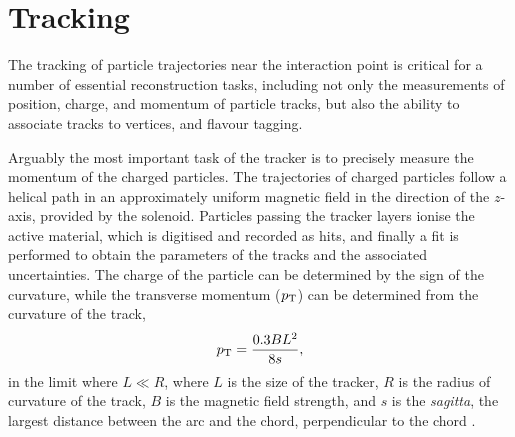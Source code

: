\section{Tracking}

The tracking of particle trajectories near the interaction point is critical
for a number of essential reconstruction tasks, including not only
the measurements of position, charge, and momentum of particle tracks, but also
the ability to associate tracks to vertices, and flavour tagging.

Arguably the most important task of the tracker is to precisely measure
the momentum of the charged particles. The trajectories of charged
particles follow a helical path in an approximately uniform magnetic
field in the direction of the $z$-axis, provided
by the solenoid. Particles passing the tracker layers ionise the active material,
which is digitised and recorded as hits, and finally a fit is performed
to obtain the parameters of the tracks and the associated uncertainties.
The charge of the particle can be determined by the 
sign of the curvature, while the transverse momentum ($p_{\text{T}}$) can be
determined from the curvature of the track,
\begin{equation}
p_{\text{T}} = \frac{0.3 B L^2}{8s},
\end{equation}
in the limit where $L \ll R$, where $L$ is the size of the tracker,
$R$ is the radius of curvature of the track, $B$ is the magnetic field
strength, and $s$ is the \textit{sagitta}, the largest distance between
the arc and the chord, perpendicular to the chord \cite{Ragusa:2007zz}.

